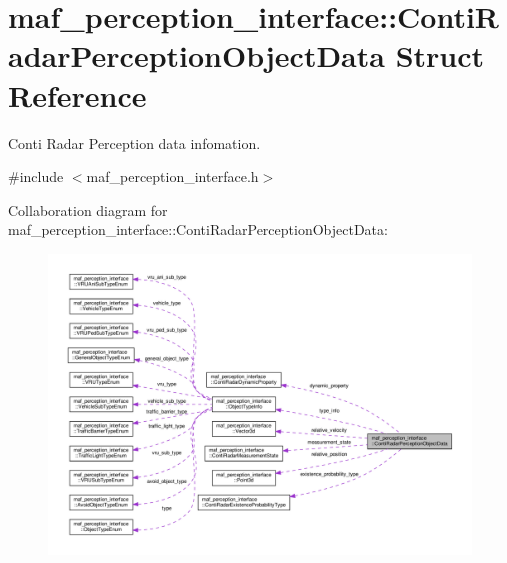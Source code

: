 \hypertarget{structmaf__perception__interface_1_1ContiRadarPerceptionObjectData}{}\section{maf\+\_\+perception\+\_\+interface\+:\+:Conti\+Radar\+Perception\+Object\+Data Struct Reference}
\label{structmaf__perception__interface_1_1ContiRadarPerceptionObjectData}


Conti Radar Perception data infomation.  




{\ttfamily \#include $<$maf\+\_\+perception\+\_\+interface.\+h$>$}



Collaboration diagram for maf\+\_\+perception\+\_\+interface\+:\+:Conti\+Radar\+Perception\+Object\+Data\+:\nopagebreak
\begin{figure}[H]
\begin{center}
\leavevmode
\includegraphics[width=350pt]{structmaf__perception__interface_1_1ContiRadarPerceptionObjectData__coll__graph}
\end{center}
\end{figure}
